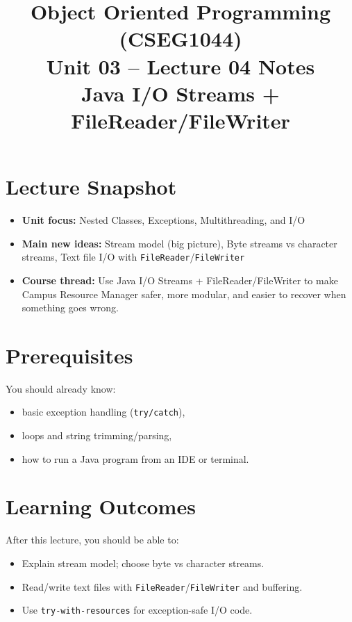 \documentclass[11pt]{article}
\title{Object Oriented Programming (CSEG1044)\\Unit 03 -- Lecture 04 Notes\\Java I/O Streams + FileReader/FileWriter}
\begin{document}
\maketitle
\tableofcontents

\section{Lecture Snapshot}
\begin{itemize}
  \item \textbf{Unit focus:} Nested Classes, Exceptions, Multithreading, and I/O
  \item \textbf{Main new ideas:} Stream model (big picture), Byte streams vs character streams, Text file I/O with \texttt{FileReader}/\texttt{FileWriter}
  \item \textbf{Course thread:} Use Java I/O Streams + FileReader/FileWriter to make Campus Resource Manager safer, more modular, and easier to recover when something goes wrong.
\end{itemize}
\notesources{\OOPSUnitIIISources}

\section{Prerequisites}
You should already know:
\begin{itemize}
  \item basic exception handling (\texttt{try/catch}),
  \item loops and string trimming/parsing,
  \item how to run a Java program from an IDE or terminal.
\end{itemize}

\section{Learning Outcomes}
After this lecture, you should be able to:
\begin{itemize}
  \item Explain stream model; choose byte vs character streams.
  \item Read/write text files with \texttt{FileReader}/\texttt{FileWriter} and buffering.
  \item Use \texttt{try-with-resources} for exception-safe I/O code.
\end{itemize}
\end{document}
